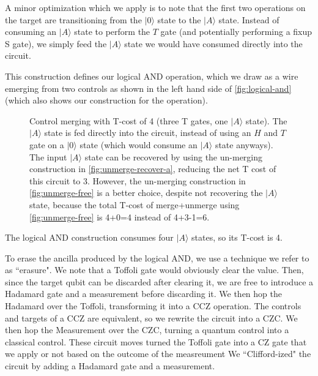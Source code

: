 \documentclass[twocolumn,longbibliography]{quantumarticle-customized}
\newcommand{\qH}{\gate{H}}
\newcommand{\qT}{\gate{T}}
\newcommand{\qTi}{\gate{T^\dagger}}
\newcommand{\qS}{\gate{S}}
\begin{document}
A minor optimization which we apply is to note that the first two operations on the target are transitioning from the $|0\rangle$ state to the $|A\rangle$ state.
Instead of consuming an $|A\rangle$ state to perform the $T$ gate (and potentially performing a fixup S gate), we simply feed the $|A\rangle$ state we would have consumed directly into the circuit.

This construction defines our logical AND operation, which we draw as a wire emerging from two controls as shown in the left hand side of \autoref{fig:logical-and} (which also shows our construction for the operation).

\begin{figure}
  \resizebox{\linewidth}{!}{
    \Qcircuit @R=1.5em @C=0.7em {
      &x &&\ctrl{1} &\qw & x  && &&          &&\qw      &\qw  &\ctrl{2} &\qw &\qw      &\qw  &\ctrl{2} &\qw &\qw &\qw &\\
      &y &&\ctrl{1} &\qw & y  &&=&&          &&\ctrl{1} &\qw  &\qw      &\qw &\ctrl{1} &\qw  &\qw      &\qw &\qw &\qw &\\
      &  &&         &\qw & xy && &&|A\rangle &&\targ    &\qTi &\targ    &\qT &\targ    &\qTi &\targ    &\qH &\qS &\qw &\\
    }
  }
  \caption{
	Control merging with T-cost of 4 (three T gates, one $|A\rangle$ state).
	The $|A\rangle$ state is fed directly into the circuit, instead of using an $H$ and $T$ gate on a $|0\rangle$ state (which would consume an $|A\rangle$ state anyways).
	The input $|A\rangle$ state can be recovered by using the un-merging construction in \autoref{fig:unmerge-recover-a}, reducing the net T cost of this circuit to 3.
	However, the un-merging construction in \autoref{fig:unmerge-free} is a better choice, despite not recovering the $|A\rangle$ state, because the total T-cost of merge+unmerge using \autoref{fig:unmerge-free} is 4+0=4 instead of 4+3-1=6.
  }
  \label{fig:logical-and}
\end{figure}

The logical AND construction consumes four $|A\rangle$ states, so its T-cost is 4.

To erase the ancilla produced by the logical AND, we use a technique we refer to as ``erasure".
We note that a Toffoli gate would obviously clear the value.
Then, since the target qubit can be discarded after clearing it, we are free to introduce a Hadamard gate and a measurement before discarding it.
We then hop the Hadamard over the Toffoli, transforming it into a CCZ operation.
The controls and targets of a CCZ are equivalent, so we rewrite the circuit into a CZC.
We then hop the Measurement over the CZC, turning a quantum control into a classical control.
These circuit moves turned the Toffoli gate into a CZ gate that we apply or not based on the outcome of the measreument
We ``Clifford-ized" the circuit by adding a Hadamard gate and a measurement.
\end{document}
